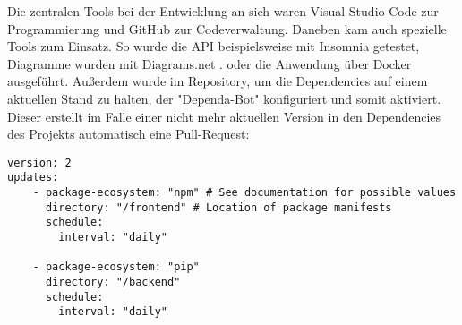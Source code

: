 Die zentralen Tools bei der Entwicklung an sich waren Visual Studio Code zur Programmierung und GitHub zur Codeverwaltung. Daneben kam auch spezielle Tools zum Einsatz. So wurde die API beispielsweise mit Insomnia \cite{insomnia} getestet, Diagramme wurden mit Diagrams.net \cite{diagrams.net}. oder die Anwendung über Docker ausgeführt. Außerdem wurde im Repository, um die Dependencies auf einem aktuellen Stand zu halten, der "Dependa-Bot" konfiguriert und somit aktiviert. Dieser erstellt im Falle einer nicht mehr aktuellen Version in den Dependencies des Projekts automatisch eine Pull-Request:

\begin{lstlisting}
version: 2
updates:
	- package-ecosystem: "npm" # See documentation for possible values
	  directory: "/frontend" # Location of package manifests
	  schedule:
		interval: "daily"
	
	- package-ecosystem: "pip"
	  directory: "/backend"
	  schedule:
		interval: "daily"
\end{lstlisting}

